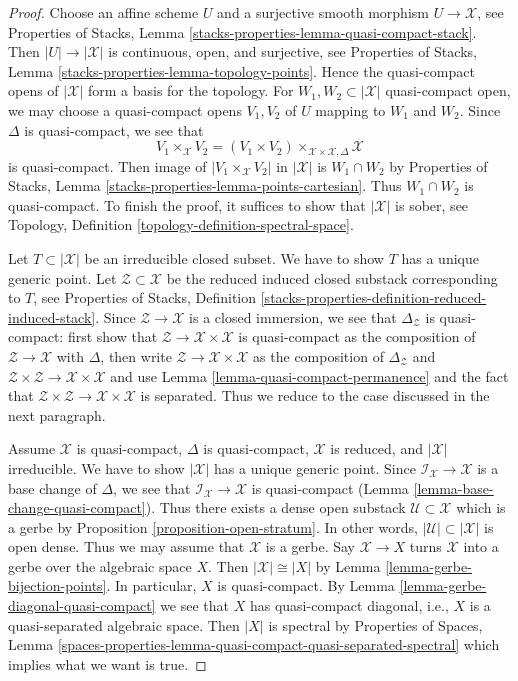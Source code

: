 \documentclass{stacks-project}
\theoremstyle{plain}
\theoremstyle{definition}
\theoremstyle{remark}
\numberwithin{equation}{subsection}
\begin{document}
\begin{proof}
Choose an affine scheme $U$ and a surjective smooth morphism
$U \to \mathcal{X}$, see
Properties of Stacks, Lemma \ref{stacks-properties-lemma-quasi-compact-stack}.
Then $|U| \to |\mathcal{X}|$ is continuous, open, and surjective, see
Properties of Stacks, Lemma \ref{stacks-properties-lemma-topology-points}.
Hence the quasi-compact opens of $|\mathcal{X}|$ form a basis
for the topology. For $W_1, W_2 \subset |\mathcal{X}|$ quasi-compact open,
we may choose a quasi-compact opens $V_1, V_2$ of $U$ mapping
to $W_1$ and $W_2$. Since $\Delta$ is quasi-compact,
we see that
$$
V_1 \times_\mathcal{X} V_2 =
(V_1 \times V_2) \times_{\mathcal{X} \times \mathcal{X}, \Delta} \mathcal{X}
$$
is quasi-compact. Then image of $|V_1 \times_\mathcal{X} V_2|$ in
$|\mathcal{X}|$ is $W_1 \cap W_2$ by
Properties of Stacks, Lemma \ref{stacks-properties-lemma-points-cartesian}.
Thus $W_1 \cap W_2$ is quasi-compact.
To finish the proof, it suffices to show that $|\mathcal{X}|$
is sober, see Topology, Definition \ref{topology-definition-spectral-space}.

\medskip\noindent
Let $T \subset |\mathcal{X}|$ be an irreducible closed subset.
We have to show $T$ has a unique generic point.
Let $\mathcal{Z} \subset \mathcal{X}$ be the reduced induced
closed substack corresponding to $T$, see
Properties of Stacks, Definition
\ref{stacks-properties-definition-reduced-induced-stack}.
Since $\mathcal{Z} \to \mathcal{X}$ is a closed immersion,
we see that $\Delta_\mathcal{Z}$ is quasi-compact:
first show that $\mathcal{Z} \to \mathcal{X} \times \mathcal{X}$
is quasi-compact as the composition of $\mathcal{Z} \to \mathcal{X}$
with $\Delta$, then write $\mathcal{Z} \to \mathcal{X} \times \mathcal{X}$
as the composition of $\Delta_\mathcal{Z}$ and
$\mathcal{Z} \times \mathcal{Z} \to \mathcal{X} \times \mathcal{X}$ and
use Lemma \ref{lemma-quasi-compact-permanence}
and the fact that
$\mathcal{Z} \times \mathcal{Z} \to \mathcal{X} \times \mathcal{X}$
is separated. Thus we reduce to the case discussed in the next
paragraph.

\medskip\noindent
Assume $\mathcal{X}$ is quasi-compact, $\Delta$ is quasi-compact,
$\mathcal{X}$ is reduced, and $|\mathcal{X}|$ irreducible.
We have to show $|\mathcal{X}|$ has a unique generic point.
Since $\mathcal{I}_\mathcal{X} \to \mathcal{X}$ is a base change of $\Delta$,
we see that $\mathcal{I}_\mathcal{X} \to \mathcal{X}$
is quasi-compact (Lemma \ref{lemma-base-change-quasi-compact}).
Thus there exists a dense open substack $\mathcal{U} \subset \mathcal{X}$
which is a gerbe by
Proposition \ref{proposition-open-stratum}.
In other words, $|\mathcal{U}| \subset |\mathcal{X}|$
is open dense. Thus we may assume that $\mathcal{X}$ is a gerbe.
Say $\mathcal{X} \to X$ turns $\mathcal{X}$ into a gerbe over the
algebraic space $X$. Then $|\mathcal{X}| \cong |X|$ by
Lemma \ref{lemma-gerbe-bijection-points}.
In particular, $X$ is quasi-compact.
By Lemma \ref{lemma-gerbe-diagonal-quasi-compact}
we see that $X$ has quasi-compact diagonal,
i.e., $X$ is a quasi-separated algebraic space.
Then $|X|$ is spectral by
Properties of Spaces, Lemma
\ref{spaces-properties-lemma-quasi-compact-quasi-separated-spectral}
which implies what we want is true.
\end{proof}
\end{document}
